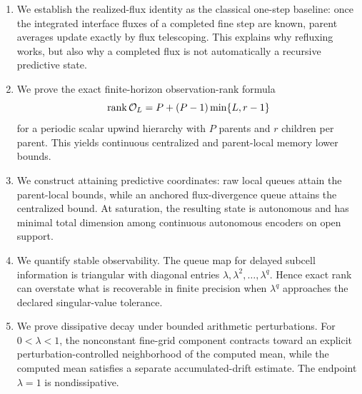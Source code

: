 \documentclass[pdflatex,sn-mathphys-num]{sn-jnl}%
\DeclareMathOperator{\rank}{rank}
\theoremstyle{thmstyleone}%
\theoremstyle{thmstyletwo}%
\theoremstyle{thmstylethree}%
\begin{document}
\begin{enumerate}
\item We establish the realized-flux identity as the classical one-step
baseline: once the integrated interface fluxes of a completed fine step are
known, parent averages update exactly by flux telescoping.  This explains why
refluxing works, but also why a completed flux is not automatically a
recursive predictive state.

\item We prove the exact finite-horizon observation-rank formula
\[
  \rank {\cal O}_L =
  P+(P-1)\min\{L,r-1\}
\]
for a periodic scalar upwind hierarchy with \(P\) parents and \(r\) children
per parent.  This yields continuous centralized and parent-local memory
lower bounds.

\item We construct attaining predictive coordinates: raw local queues attain
the parent-local bounds, while an anchored flux-divergence queue attains the
centralized bound.  At saturation, the resulting state is autonomous and has
minimal total dimension among continuous autonomous encoders on open support.

\item We quantify stable observability.  The queue map for delayed subcell
information is triangular with diagonal entries
\(\lambda,\lambda^2,\ldots,\lambda^q\).  Hence exact rank can overstate what
is recoverable in finite precision when \(\lambda^q\) approaches the
declared singular-value tolerance.

\item We prove dissipative decay under bounded arithmetic perturbations.  For
\(0<\lambda<1\), the nonconstant fine-grid component contracts toward an
explicit perturbation-controlled neighborhood of the computed mean, while
the computed mean satisfies a separate accumulated-drift estimate.  The
endpoint \(\lambda=1\) is nondissipative.
\end{enumerate}


\end{document}
